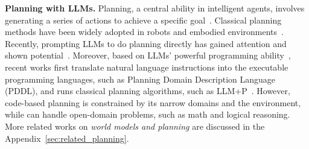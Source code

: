 
\noindent \textbf{Planning with LLMs.}
Planning, a central ability in intelligent agents, involves generating a series of actions to achieve a specific goal~\cite{mccarthy1963situations, bylander1994computational}. Classical planning methods have been widely adopted in robots and embodied environments~\cite{camacho2013model, jiang2019task}. Recently, prompting LLMs to do planning directly has gained attention and shown potential~\cite{huang2022inner, singh2022progprompt, ding2023task}. Moreover, based on LLMs' powerful programming ability~\cite{lyu2023faithful, jojic2023gpt, liu2023llm+}, recent works first translate natural language instructions into the executable programming languages, such as Planning Domain Description Language (PDDL), and runs classical planning algorithms, such as LLM+P~\cite{liu2023llm+}. However, code-based planning is constrained by its narrow domains and the environment, while \ours can handle open-domain problems, such as math and logical reasoning. More related works on \emph{world models and planning} are discussed in the Appendix~\ref{sec:related_planning}.

